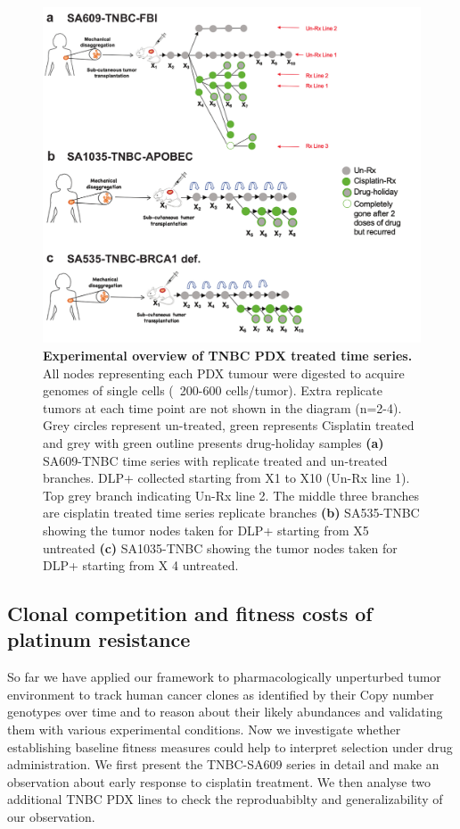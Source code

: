 \begin{figure}
\centering
\includegraphics[width=\textwidth]{Figures/treatedtimeseriesgreen.pdf}
	
\caption[Experimental overview of TNBC PDX treated time series]
	{\small
	\textbf{Experimental overview of TNBC PDX treated time series.}
	      All nodes representing each PDX tumour were digested to acquire genomes of single cells (~200-600 cells/tumor). Extra replicate tumors at each time point are not shown in the diagram (n=2-4). Grey circles represent un-treated, green represents Cisplatin treated and grey with green outline presents drug-holiday samples \textbf{(a)} SA609-TNBC time series with replicate treated and un-treated branches. DLP+ collected starting from X1 to X10 (Un-Rx line 1). Top grey branch indicating Un-Rx line 2. The middle three branches are cisplatin treated time series replicate branches \textbf{(b)} SA535-TNBC  showing the tumor nodes taken for DLP+ starting from X5 untreated \textbf{(c)} SA1035-TNBC  showing the tumor nodes taken for DLP+ starting from X 4 untreated.}
	
	\label{fig:Untreated timeseries growth curves only}
\end{figure}

\subsection{Clonal competition and fitness costs of platinum resistance}
So far we have applied our framework to pharmacologically unperturbed tumor environment to track human cancer clones as identified by their Copy number genotypes over time and to reason about their likely abundances and validating them with various experimental conditions. Now we investigate whether establishing baseline fitness measures could help to interpret selection under drug administration. We first present the TNBC-SA609 series in detail and make an observation about early response to cisplatin treatment. We then analyse two
additional TNBC PDX lines to check the reproduabiblty and generalizability of our observation.

